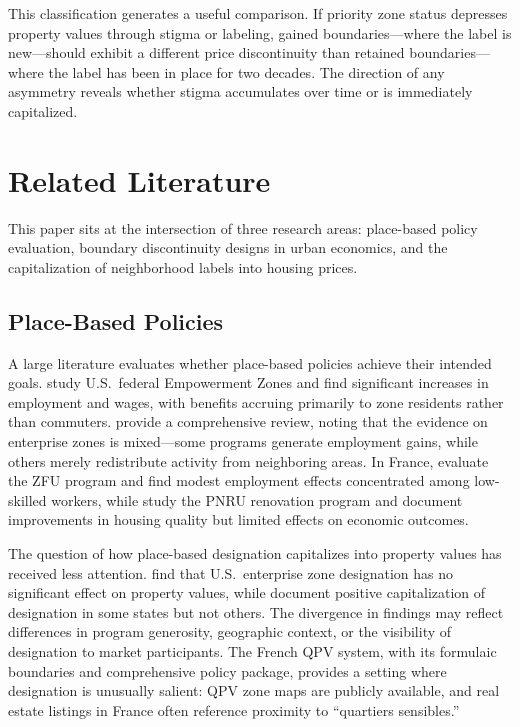 \documentclass[12pt]{article}
\begin{document}
This classification generates a useful comparison. If priority zone status depresses property values through stigma or labeling, gained boundaries---where the label is new---should exhibit a different price discontinuity than retained boundaries---where the label has been in place for two decades. The direction of any asymmetry reveals whether stigma accumulates over time or is immediately capitalized.


\section{Related Literature} \label{sec:literature}

This paper sits at the intersection of three research areas: place-based policy evaluation, boundary discontinuity designs in urban economics, and the capitalization of neighborhood labels into housing prices.

\subsection{Place-Based Policies}

A large literature evaluates whether place-based policies achieve their intended goals. \citet{busso2013assessing} study U.S.\ federal Empowerment Zones and find significant increases in employment and wages, with benefits accruing primarily to zone residents rather than commuters. \citet{neumark2015place} provide a comprehensive review, noting that the evidence on enterprise zones is mixed---some programs generate employment gains, while others merely redistribute activity from neighboring areas. In France, \citet{gobillon2012impact} evaluate the ZFU program and find modest employment effects concentrated among low-skilled workers, while \citet{mayer2017effects} study the PNRU renovation program and document improvements in housing quality but limited effects on economic outcomes.

The question of how place-based designation capitalizes into property values has received less attention. \citet{lynch2005effects} find that U.S.\ enterprise zone designation has no significant effect on property values, while \citet{hanson2009enterprise} document positive capitalization of designation in some states but not others. The divergence in findings may reflect differences in program generosity, geographic context, or the visibility of designation to market participants. The French QPV system, with its formulaic boundaries and comprehensive policy package, provides a setting where designation is unusually salient: QPV zone maps are publicly available, and real estate listings in France often reference proximity to ``quartiers sensibles.''
\end{document}
